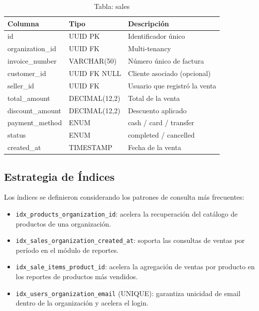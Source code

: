 \begin{longtable}[]{@{}
  >{\raggedright\arraybackslash}p{}
  >{\raggedright\arraybackslash}p{}
  >{\raggedright\arraybackslash}p{}@{}}
\caption[Tabla: sales]{Tabla: sales}\tabularnewline
\toprule\noalign{}
\begin{minipage}[b]{\linewidth}\raggedright
Columna
\end{minipage} & \begin{minipage}[b]{\linewidth}\raggedright
Tipo
\end{minipage} & \begin{minipage}[b]{\linewidth}\raggedright
Descripción
\end{minipage} \\
\midrule\noalign{}
\endhead
\bottomrule\noalign{}
\endlastfoot
id & UUID PK & Identificador único \\
organization\_id & UUID FK & Multi-tenancy \\
invoice\_number & VARCHAR(50) & Número único de factura \\
customer\_id & UUID FK NULL & Cliente asociado (opcional) \\
seller\_id & UUID FK & Usuario que registró la venta \\
total\_amount & DECIMAL(12,2) & Total de la venta \\
discount\_amount & DECIMAL(12,2) & Descuento aplicado \\
payment\_method & ENUM & cash / card / transfer \\
status & ENUM & completed / cancelled \\
created\_at & TIMESTAMP & Fecha de la venta \\
\end{longtable}

\subsection{Estrategia de Índices}\label{estrategia-de-uxedndices}

Los índices se definieron considerando los patrones de consulta más frecuentes:

\begin{itemize}
\tightlist
\item
  \texttt{idx\_products\_organization\_id}: acelera la recuperación del catálogo de productos de una organización.
\item
  \texttt{idx\_sales\_organization\_created\_at}: soporta las consultas de ventas por período en el módulo de reportes.
\item
  \texttt{idx\_sale\_items\_product\_id}: acelera la agregación de ventas por producto en los reportes de productos más vendidos.
\item
  \texttt{idx\_users\_organization\_email} (UNIQUE): garantiza unicidad de email dentro de la organización y acelera el login.
\end{itemize}

